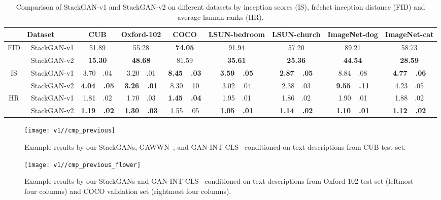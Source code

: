 \documentclass[10pt,journal,letterpaper,compsoc]{IEEEtran}
\begin{document}
\begin{table*}[bt]
\begin{center}
\normalfont
\begin{tabular}{|c|c|c|c|c|c|c|c|c|}
\hline
 \multicolumn{2}{|c|}{Dataset} &CUB &Oxford-102 &COCO &LSUN-bedroom &LSUN-church &ImageNet-dog &ImageNet-cat \\
\hline
\multirow{2}{5em}{FID~} &StackGAN-v1 &51.89 &55.28 &\bf74.05 &91.94 &57.20 &89.21 &58.73\\ 
\cline{2-9}
&StackGAN-v2 &\bf15.30 &\bf48.68 &81.59 &\bf35.61 &\bf25.36 &\bf44.54 &\bf28.59\\ 
\hline
\multirow{2}{5em}{IS~} &StackGAN-v1 &3.70~~.04 &3.20~~.01 &\bf8.45~~.03 &\bf3.59~~.05 &\bf2.87~~.05 &8.84~~.08 &\bf4.77~~.06\\ 
\cline{2-9}
&StackGAN-v2 &\bf4.04~~.05 &\bf3.26~~.01 &8.30~~.10 &3.02~~.04 &2.38~~.03 &\bf9.55~~.11 &4.23~~.05\\ 
\hline
\multirow{2}{5em}{HR~} &StackGAN-v1 &1.81~~.02 &1.70~~.03 &\bf1.45~~.04 &1.95~~.01 &1.86~~.02 &1.90~~.01 &1.88~~.02\\ 
\cline{2-9}
&StackGAN-v2 &\bf1.19~~.02 &\bf1.30~~.03 &1.55~~.05 &\bf1.05~~.01 &\bf1.14~~.02 &\bf1.10~~.01 &\bf1.12~~.02 \\ 
\hline
\end{tabular}
\end{center}
\vspace{-8pt}
    \caption{Comparison of StackGAN-v1 and StackGAN-v2 on different datasets by inception scores (IS), fr\'echet inception distance (FID) and average human ranks (HR).}
\label{tab:cmp_v1_v2} 
\end{table*}



\begin{figure*}[tb]
\begin{center}
\texttt{[image: v1//cmp\_previous]}
\end{center}
\vspace{-8pt}
    \caption{Example results by our StackGANs, GAWWN~\cite{reed2016learning}, and GAN-INT-CLS~\cite{reed2016generative} conditioned on text descriptions from CUB test set.}
\vspace{-2pt}
\label{fig:cmp_previous}
\end{figure*}



\begin{figure*}[tb]
\begin{center}
\texttt{[image: v1//cmp\_previous\_flower]}
\end{center}
\vspace{-8pt}
    \caption{Example results by our StackGANs and GAN-INT-CLS~\cite{reed2016generative} conditioned on text descriptions from Oxford-102 test set (leftmost four columns) and COCO validation set (rightmost four columns).}
 \vspace{-8pt}
\label{fig:cmp_previous_flower}
\end{figure*}
\end{document}
